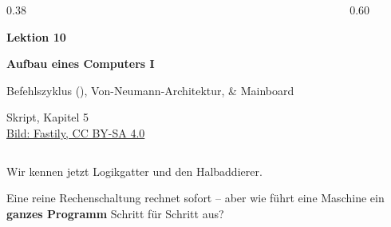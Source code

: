 \renewcommand{\thelektion}{L10 \textperiodcentered{} Aufbau eines Computers I}

\begin{frame}[plain]
\begin{columns}[c,onlytextwidth]
    \begin{column}{0.38\textwidth}
        {\color{FDUgreen!80!black}\large\bfseries Lektion 10\par}\vspace{2mm}
        {\fontsize{18}{22}\selectfont\bfseries Aufbau eines Computers I\par}\vspace{3mm}
        {\small\color{DarkSlateGray} Befehlszyklus (), Von-Neumann-Architektur,  \& Mainboard\par}\vspace{5mm}
        {\tiny\color{gray} Skript, Kapitel 5\\\href{https://commons.wikimedia.org/wiki/File:Custom_Computer_with_Open_Case_1_2018-05-06.jpg}{\color{RoyalBlue}Bild: Fastily, CC BY-SA 4.0}\par}
    \end{column}
    \begin{column}{0.60\textwidth}
        \centering
        \resizebox{\linewidth}{!}{%
        }
    \end{column}
\end{columns}
\end{frame}

\begin{frame}
\begin{center}
Wir kennen jetzt Logikgatter und den Halbaddierer.
\vspace{3mm}

Eine reine Rechenschaltung rechnet sofort -- aber wie führt eine Maschine ein \textbf{ganzes Programm} Schritt für Schritt aus?
\end{center}
\begin{center}

\end{center}
\end{frame}

{
\begin{frame}
\end{frame}}

